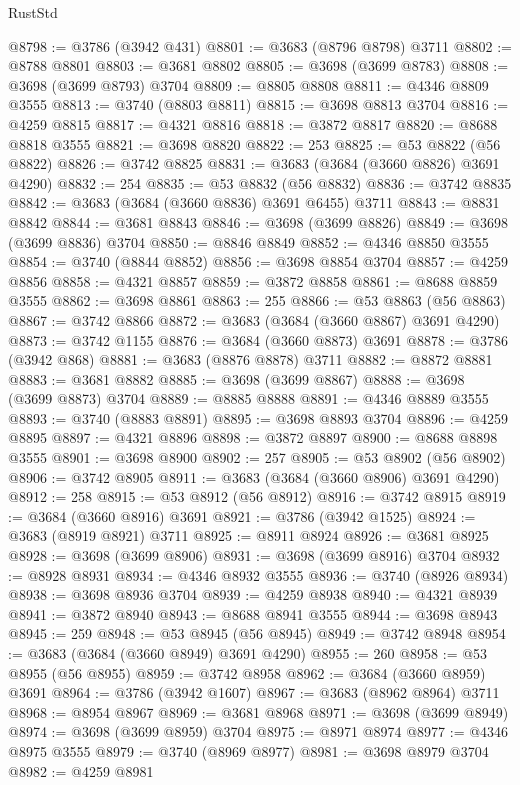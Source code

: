\begin{lexlean}{RustStd}
\begin{coremodule}
@8798 := @3786 (@3942 @431)
@8801 := @3683 (@8796 @8798) @3711
@8802 := @8788 @8801
@8803 := @3681 @8802
@8805 := @3698 (@3699 @8783)
@8808 := @3698 (@3699 @8793) @3704
@8809 := @8805 @8808
@8811 := @4346 @8809 @3555
@8813 := @3740 (@8803 @8811)
@8815 := @3698 @8813 @3704
@8816 := @4259 @8815
@8817 := @4321 @8816
@8818 := @3872 @8817
@8820 := @8688 @8818 @3555
@8821 := @3698 @8820
@8822 := 253
@8825 := @53 @8822 (@56 @8822)
@8826 := @3742 @8825
@8831 := @3683 (@3684 (@3660 @8826) @3691 @4290)
@8832 := 254
@8835 := @53 @8832 (@56 @8832)
@8836 := @3742 @8835
@8842 := @3683 (@3684 (@3660 @8836) @3691 @6455) @3711
@8843 := @8831 @8842
@8844 := @3681 @8843
@8846 := @3698 (@3699 @8826)
@8849 := @3698 (@3699 @8836) @3704
@8850 := @8846 @8849
@8852 := @4346 @8850 @3555
@8854 := @3740 (@8844 @8852)
@8856 := @3698 @8854 @3704
@8857 := @4259 @8856
@8858 := @4321 @8857
@8859 := @3872 @8858
@8861 := @8688 @8859 @3555
@8862 := @3698 @8861
@8863 := 255
@8866 := @53 @8863 (@56 @8863)
@8867 := @3742 @8866
@8872 := @3683 (@3684 (@3660 @8867) @3691 @4290)
@8873 := @3742 @1155
@8876 := @3684 (@3660 @8873) @3691
@8878 := @3786 (@3942 @868)
@8881 := @3683 (@8876 @8878) @3711
@8882 := @8872 @8881
@8883 := @3681 @8882
@8885 := @3698 (@3699 @8867)
@8888 := @3698 (@3699 @8873) @3704
@8889 := @8885 @8888
@8891 := @4346 @8889 @3555
@8893 := @3740 (@8883 @8891)
@8895 := @3698 @8893 @3704
@8896 := @4259 @8895
@8897 := @4321 @8896
@8898 := @3872 @8897
@8900 := @8688 @8898 @3555
@8901 := @3698 @8900
@8902 := 257
@8905 := @53 @8902 (@56 @8902)
@8906 := @3742 @8905
@8911 := @3683 (@3684 (@3660 @8906) @3691 @4290)
@8912 := 258
@8915 := @53 @8912 (@56 @8912)
@8916 := @3742 @8915
@8919 := @3684 (@3660 @8916) @3691
@8921 := @3786 (@3942 @1525)
@8924 := @3683 (@8919 @8921) @3711
@8925 := @8911 @8924
@8926 := @3681 @8925
@8928 := @3698 (@3699 @8906)
@8931 := @3698 (@3699 @8916) @3704
@8932 := @8928 @8931
@8934 := @4346 @8932 @3555
@8936 := @3740 (@8926 @8934)
@8938 := @3698 @8936 @3704
@8939 := @4259 @8938
@8940 := @4321 @8939
@8941 := @3872 @8940
@8943 := @8688 @8941 @3555
@8944 := @3698 @8943
@8945 := 259
@8948 := @53 @8945 (@56 @8945)
@8949 := @3742 @8948
@8954 := @3683 (@3684 (@3660 @8949) @3691 @4290)
@8955 := 260
@8958 := @53 @8955 (@56 @8955)
@8959 := @3742 @8958
@8962 := @3684 (@3660 @8959) @3691
@8964 := @3786 (@3942 @1607)
@8967 := @3683 (@8962 @8964) @3711
@8968 := @8954 @8967
@8969 := @3681 @8968
@8971 := @3698 (@3699 @8949)
@8974 := @3698 (@3699 @8959) @3704
@8975 := @8971 @8974
@8977 := @4346 @8975 @3555
@8979 := @3740 (@8969 @8977)
@8981 := @3698 @8979 @3704
@8982 := @4259 @8981

\end{coremodule}
\end{lexlean}

